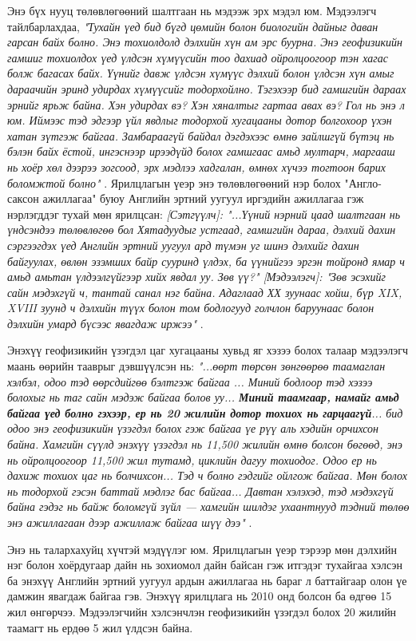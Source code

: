 \documentclass[10pt,twocolumn,letterpaper]{article}
\begin{document}
Энэ бүх нууц төлөвлөгөөний шалтгаан нь мэдээж эрх мэдэл юм. Мэдээлэгч тайлбарлахдаа, \textit{"Тухайн үед бид бүгд цөмийн болон биологийн дайныг даван гарсан байх болно. Энэ тохиолдолд дэлхийн хүн ам эрс буурна. Энэ геофизикийн гамшиг тохиолдох үед үлдсэн хүмүүсийн тоо дахиад ойролцоогоор тэн хагас болж багасах байх. Үүнийг давж үлдсэн хүмүүс дэлхий болон үлдсэн хүн амыг дараачийн эринд удирдах хүмүүсийг тодорхойлно. Тэгэхээр бид гамшгийн дараах эрнийг ярьж байна. Хэн удирдах вэ? Хэн хяналтыг гартаа авах вэ? Гол нь энэ л юм. Иймээс тэд эдгээр үйл явдлыг тодорхой хугацааны дотор болгохоор үхэн хатан зүтгэж байгаа. Замбараагүй байдал дэгдэхээс өмнө зайлшгүй бүтэц нь бэлэн байх ёстой, ингэснээр ирээдүйд болох гамшгаас амьд мултарч, маргааш нь хоёр хөл дээрээ зогсоод, эрх мэдлээ хадгалан, өмнөх хүчээ тогтоон барих боломжтой болно"} \cite{4}. Ярилцлагын үеэр энэ төлөвлөгөөний нэр болох "Англо-саксон ажиллагаа" буюу Английн эртний уугуул иргэдийн ажиллагаа гэж нэрлэгддэг тухай мөн ярилцсан: \textit{[Сэтгүүлч]: "...Үүний нэрний цаад шалтгаан нь үндсэндээ төлөвлөгөө бол Хятадуудыг устгаад, гамшгийн дараа, дэлхий дахин сэргээгдэх үед Английн эртний уугуул ард түмэн уг шинэ дэлхийг дахин байгуулах, өвлөн эзэмших байр сууринд үлдэх, ба үүнийгээ эргэн тойронд ямар ч амьд амьтан үлдээлгүйгээр хийх явдал уу. Зөв үү?" [Мэдээлэгч]: "Зөв эсэхийг сайн мэдэхгүй ч, тантай санал нэг байна. Адаглаад ХХ зуунаас хойш, бүр XIX, XVIII зуунд ч дэлхийн түүх болон том бодлогууд голчлон баруунаас болон дэлхийн умард бүсээс явагдаж иржээ"} \cite{4}.

Энэхүү геофизикийн үзэгдэл цаг хугацааны хувьд яг хэзээ болох талаар мэдээлэгч маань өөрийн тааврыг дэвшүүлсэн нь: \textit{"...өөрт төрсөн зөнгөөрөө таамаглан хэлбэл, одоо тэд өөрсдийгөө бэлтгэж байгаа ... Миний бодлоор тэд хэзээ болохыг нь таг сайн мэдэж байгаа болов уу... \textbf{Миний таамгаар, намайг амьд байгаа үед болно гэхээр, ер нь 20 жилийн дотор тохиох нь гарцаагүй}... бид одоо энэ геофизикийн үзэгдэл болох гэж байгаа үе рүү аль хэдийн орчихсон байна. Хамгийн сүүлд энэхүү үзэгдэл нь 11,500 жилийн өмнө болсон бөгөөд, энэ нь ойролцоогоор 11,500 жил тутамд, циклийн дагуу тохиодог. Одоо ер нь дахиж тохиох цаг нь болчихсон... Тэд ч болно гэдгийг ойлгож байгаа. Мөн болох нь тодорхой гэсэн баттай мэдлэг бас байгаа... Давтан хэлэхэд, тэд мэдэхгүй байна гэдэг нь байж боломгүй зүйл — хамгийн шилдэг ухаантнууд тэдний төлөө энэ ажиллагаан дээр ажиллаж байгаа шүү дээ"} \cite{4}.

Энэ нь талархахуйц хүчтэй мэдүүлэг юм. Ярилцлагын үеэр тэрээр мөн дэлхийн нэг болон хоёрдугаар дайн нь зохиомол дайн байсан гэж итгэдэг тухайгаа хэлсэн ба энэхүү Английн эртний уугуул ардын ажиллагаа нь бараг л баттайгаар олон үе дамжин явагдаж байгаа гэв. Энэхүү ярилцлага нь 2010 онд болсон ба өдгөө 15 жил өнгөрчээ. Мэдээлэгчийн хэлсэнчлэн геофизикийн үзэгдэл болох 20 жилийн таамагт нь ердөө 5 жил үлдсэн байна. 
\end{document}
